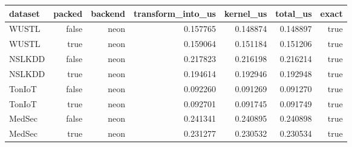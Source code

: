 \begin{tabular}{lrrrrrr}
\toprule
dataset & packed & backend & transform\_into\_us & kernel\_us & total\_us & exact \\
\midrule
WUSTL & false & neon & 0.157765 & 0.148874 & 0.148897 & true \\
WUSTL & true & neon & 0.159064 & 0.151184 & 0.151206 & true \\
NSLKDD & false & neon & 0.217823 & 0.216198 & 0.216214 & true \\
NSLKDD & true & neon & 0.194614 & 0.192946 & 0.192948 & true \\
TonIoT & false & neon & 0.092260 & 0.091269 & 0.091270 & true \\
TonIoT & true & neon & 0.092701 & 0.091745 & 0.091749 & true \\
MedSec & false & neon & 0.241341 & 0.240895 & 0.240898 & true \\
MedSec & true & neon & 0.231277 & 0.230532 & 0.230534 & true \\
\bottomrule
\end{tabular}
